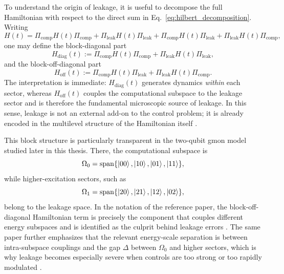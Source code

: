 To understand the origin of leakage, it is useful to decompose the full Hamiltonian with respect to the direct sum in Eq.~\eqref{eq:hilbert_decomposition}. Writing
\begin{equation}
H(t)
=
\Pi_{\mathrm{comp}} H(t)\Pi_{\mathrm{comp}}
+
\Pi_{\mathrm{leak}} H(t)\Pi_{\mathrm{leak}}
+
\Pi_{\mathrm{comp}} H(t)\Pi_{\mathrm{leak}}
+
\Pi_{\mathrm{leak}} H(t)\Pi_{\mathrm{comp}},
\label{eq:block_hamiltonian_decomposition}
\end{equation}
one may define the block-diagonal part
\begin{equation}
H_{\mathrm{diag}}(t)
:=
\Pi_{\mathrm{comp}} H(t)\Pi_{\mathrm{comp}}
+
\Pi_{\mathrm{leak}} H(t)\Pi_{\mathrm{leak}},
\label{eq:block_diagonal_hamiltonian}
\end{equation}
and the block-off-diagonal part
\begin{equation}
H_{\mathrm{off}}(t)
:=
\Pi_{\mathrm{comp}} H(t)\Pi_{\mathrm{leak}}
+
\Pi_{\mathrm{leak}} H(t)\Pi_{\mathrm{comp}}.
\label{eq:block_off_diagonal_hamiltonian}
\end{equation}
The interpretation is immediate: $H_{\mathrm{diag}}(t)$ generates dynamics \emph{within} each sector, whereas $H_{\mathrm{off}}(t)$ couples the computational subspace to the leakage sector and is therefore the fundamental microscopic source of leakage. In this sense, leakage is not an external add-on to the control problem; it is already encoded in the multilevel structure of the Hamiltonian itself \cite{Motzoi2009,Gambetta2011,Niu2019}.

This block structure is particularly transparent in the two-qubit gmon model studied later in this thesis. There, the computational subspace is
\begin{equation}
\Omega_{0}
=
\mathrm{span}\{\ket{00},\ket{10},\ket{01},\ket{11}\},
\label{eq:gmon_computational_subspace}
\end{equation}
while higher-excitation sectors, such as
\begin{equation}
\Omega_{1}
=
\mathrm{span}\{\ket{20},\ket{21},\ket{12},\ket{02}\},
\label{eq:gmon_first_excited_subspace}
\end{equation}
belong to the leakage space. In the notation of the reference paper, the block-off-diagonal Hamiltonian term is precisely the component that couples different energy subspaces and is identified as the culprit behind leakage errors \cite{Niu2019}. The same paper further emphasizes that the relevant energy-scale separation is between intra-subspace couplings and the gap $\Delta$ between $\Omega_{0}$ and higher sectors, which is why leakage becomes especially severe when controls are too strong or too rapidly modulated \cite{Niu2019}.

